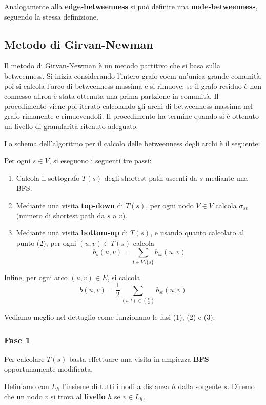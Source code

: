 Analogamente alla \textbf{edge-betweenness} si può definire una \textbf{node-betweenness}, seguendo la stessa definizione.

\subsection{Metodo di Girvan-Newman}

Il metodo di Girvan-Newman è un metodo partitivo che si basa sulla betweenness. Si inizia considerando l'intero grafo coem un'unica grande comunità, poi si calcola l'arco di betweenness massima e si rimuove: se il grafo residuo è non connesso allroa è stata ottenuta una prima partzione in comunità. Il procedimento viene poi iterato calcolando gli archi di betweenness massima nel grafo rimanente e rimuovendoli. Il procedimento ha termine quando si è ottenuto un livello di granularità ritenuto adeguato.

Lo schema dell'algoritmo per il calcolo delle betweenness degli archi è il seguente:

Per ogni $s \in V$, si eseguono i seguenti tre passi:
\begin{enumerate}
    \item Calcola il sottografo $T(s)$ degli shortest path uscenti da $s$ mediante una BFS.
    \item Mediante una visita \textbf{top-down} di $T(s)$, per ogni nodo $V \in V$ calcola $\sigma_{sv}$ (numero di shortest path da $s$ a $v$).
    \item Mediante una visita \textbf{bottom-up} di $T(s)$, e usando quanto calcolato al punto (2), per ogni $(u, v) \in T(s)$ calcola 
    \[
        b_s(u,v) = \sum_{t \in V \setminus \{s\}} b_{st}(u, v)    
    \]
\end{enumerate}
Infine, per ogni arco $(u,v) \in E$, si calcola 
\[
    b(u,v) = \frac{1}{2} \sum_{(s,t) \in \binom{V}{2}} b_{st}(u,v)
\]

Vediamo meglio nel dettaglio come funzionano le fasi (1), (2) e (3).

\subsubsection{Fase 1}
Per calcolare $T(s)$ basta effettuare una visita in ampiezza \textbf{BFS} opportunamente modificata.

Definiamo con $L_h$ l'insieme di tutti i nodi a distanza $h$ dalla sorgente $s$.
Diremo che un nodo $v$ si trova al \textbf{livello} $h$ se $v \in L_h$.

